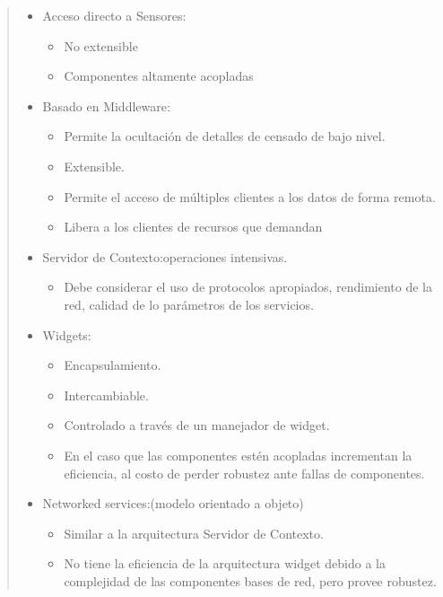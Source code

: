 \begin{quotation} 

\begin{itemize}
\item Acceso directo a Sensores:
	    \begin{itemize}
	    \item No extensible
	    \item Componentes altamente acopladas
	    \end{itemize}

\item Basado en Middleware: 	   
	      \begin{itemize}
	      \item Permite la ocultación de detalles de censado de bajo nivel.
	      \item Extensible.
	      \item Permite el acceso de múltiples clientes a los datos de
forma remota.
	      \item Libera a los clientes de recursos que demandan
	      \end{itemize}

\item Servidor de Contexto:operaciones intensivas.
	    \begin{itemize}
	    \item Debe considerar el uso de protocolos apropiados, rendimiento
de la red, calidad de lo parámetros de los servicios.
	    \end{itemize}

\item Widgets:
	  \begin{itemize}
	  \item Encapsulamiento.
	  \item Intercambiable.
	  \item Controlado a través de un manejador de widget.
	  \item En el caso que las componentes estén acopladas incrementan la
	  eficiencia, al costo de perder robustez ante fallas de componentes.
	  
	  \end{itemize}
\item Networked services:(modelo orientado a objeto) 
	\begin{itemize}
	\item Similar a la arquitectura Servidor de Contexto.
	\item No tiene la eficiencia de la arquitectura widget debido a la
    complejidad
	de las componentes bases de red, pero provee robustez.
	\end{itemize}


\end{itemize}
\end{quotation}
